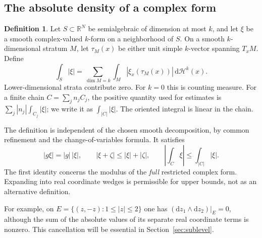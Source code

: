 \documentclass[11pt]{article}
\numberwithin{equation}{section}
\theoremstyle{definition}
\newtheorem{definition}[theorem]{Definition}
\theoremstyle{remark}
\newcommand{\R}{\mathbb R}
\newcommand{\dd}{\mathrm d}
\begin{document}
\subsection{The absolute density of a complex form}
\begin{definition}\label{def:density}
Let $S\subset\R^N$ be semialgebraic of dimension at most $k$, and let
$\xi$ be a smooth complex-valued $k$-form on a neighborhood of $S$.
On a smooth $k$-dimensional stratum $M$, let $\tau_M(x)$ be either unit
simple $k$-vector spanning $T_xM$. Define
\begin{equation}\label{eq:absolute-density}
 \int_S|\xi|
 =\sum_{\dim M=k}\int_M|\xi_x(\tau_M(x))|\,\dd\mathcal H^k(x).
\end{equation}
Lower-dimensional strata contribute zero. For $k=0$ this is counting
measure. For a finite chain $C=\sum_jn_jC_j$, the positive quantity used
for estimates is $\sum_j|n_j|\int_{C_j}|\xi|$; we write it as
$\int_{|C|}|\xi|$. The oriented integral is linear in the chain.
\end{definition}

The definition is independent of the chosen smooth decomposition, by
common refinement and the change-of-variables formula. It satisfies
\begin{equation}\label{eq:density-identities}
 |g\xi|=|g|\,|\xi|,\qquad
 |\xi+\zeta|\le|\xi|+|\zeta|,\qquad
 \left|\int_C\xi\right|\le\int_{|C|}|\xi|.
\end{equation}
The first identity concerns the modulus of the \emph{full} restricted
complex form. Expanding into real coordinate wedges is permissible for
upper bounds, not as an alternative definition.

For example, on $E=\{(z,-z):1\le|z|\le2\}$ one has
$(\dd z_1\wedge\dd z_2)|_E=0$, although the sum of the absolute values
of its separate real coordinate terms is nonzero. This cancellation will
be essential in Section~\ref{sec:sublevel}.
\end{document}
